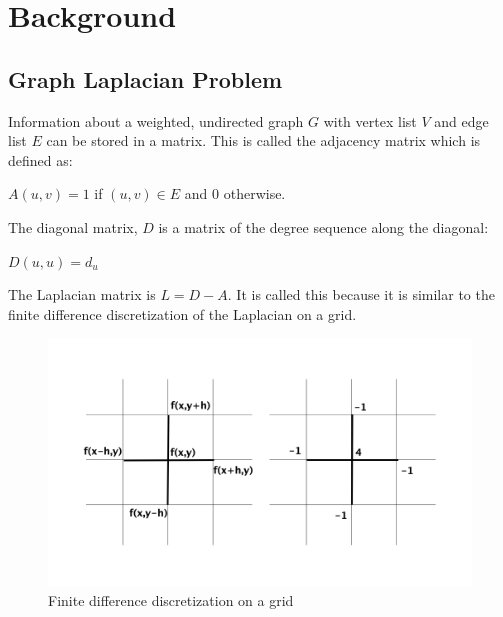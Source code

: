\documentclass{article}
\begin{document}
\section{Background}
\subsection{Graph Laplacian Problem}
Information about a weighted, undirected graph $G$ with vertex list $V$ and edge list $E$ can be stored in a matrix. This is called the adjacency matrix which is defined as:\\
\begin{center} 
$A(u,v) = 1$ if $(u,v) \in E$ and $0$ otherwise.\\
\end{center}
The diagonal matrix, $D$ is a matrix of the degree sequence along the diagonal:\\
\begin{center}
$D(u,u) = d_u$
\end{center}
The Laplacian matrix is $L = D-A$. It is called this because it is similar to the finite difference discretization of the Laplacian on a grid.\\
\begin{figure}[H]
\begin{center}
\includegraphics[width=\linewidth]{laplace.png}
  \caption{Finite difference discretization on a grid}
  \end{center}
  \end{figure}
 
\end{document}
